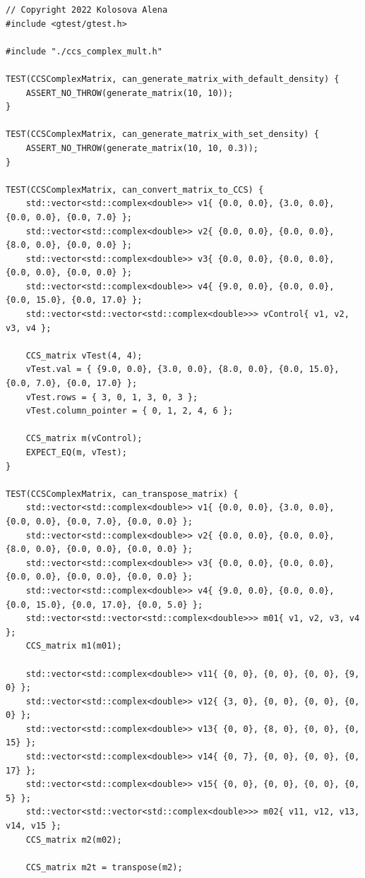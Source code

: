 \documentclass{report}
\begin{document}
\begin{lstlisting}
// Copyright 2022 Kolosova Alena
#include <gtest/gtest.h>

#include "./ccs_complex_mult.h"

TEST(CCSComplexMatrix, can_generate_matrix_with_default_density) {
    ASSERT_NO_THROW(generate_matrix(10, 10));
}

TEST(CCSComplexMatrix, can_generate_matrix_with_set_density) {
    ASSERT_NO_THROW(generate_matrix(10, 10, 0.3));
}

TEST(CCSComplexMatrix, can_convert_matrix_to_CCS) {
    std::vector<std::complex<double>> v1{ {0.0, 0.0}, {3.0, 0.0}, {0.0, 0.0}, {0.0, 7.0} };
    std::vector<std::complex<double>> v2{ {0.0, 0.0}, {0.0, 0.0}, {8.0, 0.0}, {0.0, 0.0} };
    std::vector<std::complex<double>> v3{ {0.0, 0.0}, {0.0, 0.0}, {0.0, 0.0}, {0.0, 0.0} };
    std::vector<std::complex<double>> v4{ {9.0, 0.0}, {0.0, 0.0}, {0.0, 15.0}, {0.0, 17.0} };
    std::vector<std::vector<std::complex<double>>> vControl{ v1, v2, v3, v4 };

    CCS_matrix vTest(4, 4);
    vTest.val = { {9.0, 0.0}, {3.0, 0.0}, {8.0, 0.0}, {0.0, 15.0}, {0.0, 7.0}, {0.0, 17.0} };
    vTest.rows = { 3, 0, 1, 3, 0, 3 };
    vTest.column_pointer = { 0, 1, 2, 4, 6 };

    CCS_matrix m(vControl);
    EXPECT_EQ(m, vTest);
}

TEST(CCSComplexMatrix, can_transpose_matrix) {
    std::vector<std::complex<double>> v1{ {0.0, 0.0}, {3.0, 0.0}, {0.0, 0.0}, {0.0, 7.0}, {0.0, 0.0} };
    std::vector<std::complex<double>> v2{ {0.0, 0.0}, {0.0, 0.0}, {8.0, 0.0}, {0.0, 0.0}, {0.0, 0.0} };
    std::vector<std::complex<double>> v3{ {0.0, 0.0}, {0.0, 0.0}, {0.0, 0.0}, {0.0, 0.0}, {0.0, 0.0} };
    std::vector<std::complex<double>> v4{ {9.0, 0.0}, {0.0, 0.0}, {0.0, 15.0}, {0.0, 17.0}, {0.0, 5.0} };
    std::vector<std::vector<std::complex<double>>> m01{ v1, v2, v3, v4 };
    CCS_matrix m1(m01);

    std::vector<std::complex<double>> v11{ {0, 0}, {0, 0}, {0, 0}, {9, 0} };
    std::vector<std::complex<double>> v12{ {3, 0}, {0, 0}, {0, 0}, {0, 0} };
    std::vector<std::complex<double>> v13{ {0, 0}, {8, 0}, {0, 0}, {0, 15} };
    std::vector<std::complex<double>> v14{ {0, 7}, {0, 0}, {0, 0}, {0, 17} };
    std::vector<std::complex<double>> v15{ {0, 0}, {0, 0}, {0, 0}, {0, 5} };
    std::vector<std::vector<std::complex<double>>> m02{ v11, v12, v13, v14, v15 };
    CCS_matrix m2(m02);

    CCS_matrix m2t = transpose(m2);


\end{lstlisting}
\end{document}
